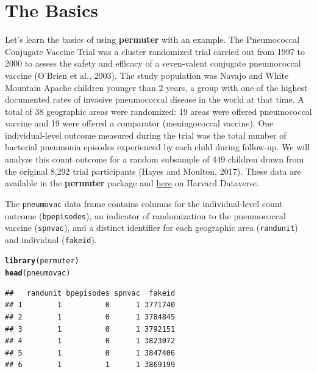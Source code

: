\documentclass[12pt]{article}\usepackage[]{graphicx}\usepackage[]{color}
\makeatletter
\newcommand{\hlstd}[1]{\textcolor[rgb]{0.345,0.345,0.345}{#1}}%
\newcommand{\hlkwd}[1]{\textcolor[rgb]{0.737,0.353,0.396}{\textbf{#1}}}%
\newenvironment{kframe}{%
 \def\at@end@of@kframe{}%
 \ifinner\ifhmode%
  \def\at@end@of@kframe{\end{minipage}}%
  \begin{minipage}{\columnwidth}%
 \fi\fi%
 \def\FrameCommand##1{\hskip\@totalleftmargin \hskip-\fboxsep
 \colorbox{shadecolor}{##1}\hskip-\fboxsep
     \hskip-\linewidth \hskip-\@totalleftmargin \hskip\columnwidth}%
 \MakeFramed {\advance\hsize-\width
   \@totalleftmargin\z@ \linewidth\hsize
   \@setminipage}}%
 {\par\unskip\endMakeFramed%
 \at@end@of@kframe}
\newenvironment{knitrout}{}{} %
\makeatother
\begin{document}
\section{The Basics}
Let's learn the basics of using \textbf{permuter} with an example. The Pneumococcal Conjugate Vaccine Trial was a cluster randomized trial carried out from 1997 to 2000 to assess the safety and efficacy of a seven-valent conjugate pneumococcal vaccine (O'Brien et al., 2003). The study population was Navajo and White Mountain Apache children younger than 2 years, a group with one of the highest documented rates of invasive pneumococcal disease in the world at that time. A total of 38 geographic areas were randomized: 19 areas were offered pneumococcal vaccine and 19 were offered a comparator (meningococcal vaccine). One individual-level outcome measured during the trial was the total number of bacterial pneumonia episodes experienced by each child during follow-up. We will analyze this count outcome for a random subsample of 449 children drawn from the original 8,292 trial participants (Hayes and Moulton, 2017). These data are available in the \textbf{permuter} package and \href{https://dataverse.harvard.edu/dataverse/crt}{here} on Harvard Dataverse.

The \texttt{pneumovac} data frame contains columns for the individual-level count outcome (\texttt{bpepisodes}), an indicator of randomization to the pneumococcal vaccine (\texttt{spnvac}), and a distinct identifier for each geographic area (\texttt{randunit}) and individual (\texttt{fakeid}).
\begin{knitrout}
\color{fgcolor}\begin{kframe}
\begin{alltt}
\hlkwd{library}\hlstd{(permuter)}
\hlkwd{head}\hlstd{(pneumovac)}
\end{alltt}
\begin{verbatim}
##   randunit bpepisodes spnvac  fakeid
## 1        1          0      1 3771740
## 2        1          0      1 3784845
## 3        1          0      1 3792151
## 4        1          0      1 3823072
## 5        1          0      1 3847406
## 6        1          1      1 3869199
\end{verbatim}
\end{kframe}
\end{knitrout}
\end{document}
